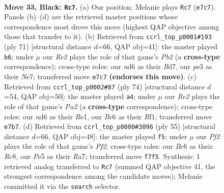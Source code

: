 \documentclass[11pt]{article}
\begin{document}
\clearpage

\begin{figure}[p]\centering
\begin{subfigure}{0.46\textwidth}\centering
\resizebox{\linewidth}{!}{%
\newchessgame
\chessboard[
  setfen={r5k1/4rppp/nnbN4/p3p1P1/8/1P2P1R1/P3B1PP/RN5K b - - 5 33},
  showmover=false,
  pgfstyle=straightmove, color=movearrow, markmove={e7-c7}
]}
\caption{}
\end{subfigure}\hfill
\begin{subfigure}{0.46\textwidth}\centering
\resizebox{\linewidth}{!}{%
\newchessgame
\chessboard[
  setfen={2r5/1p1bnpk1/7p/p2pr1p1/P7/1PP4P/2BRNPP1/1R3K2 b - - 8 36},
  showmover=false,
  pgfstyle=straightmove, color=movearrow, markmove={b7-b6}
]}
\caption{}
\end{subfigure}
\\[4pt]
\begin{subfigure}{0.46\textwidth}\centering
\resizebox{\linewidth}{!}{%
\newchessgame
\chessboard[
  setfen={3br1n1/1kp2r2/p7/1pp1Pp2/7p/2N4P/PPP3PB/4RR1K w - - 8 38},
  showmover=false,
  pgfstyle=straightmove, color=movearrow, markmove={a2-a4}
]}
\caption{}
\end{subfigure}\hfill
\begin{subfigure}{0.46\textwidth}\centering
\resizebox{\linewidth}{!}{%
\newchessgame
\chessboard[
  setfen={2r3k1/r3bppp/8/p3N3/P2pn3/8/1PP2PPP/R1R1B1K1 b - - 1 28},
  showmover=false,
  pgfstyle=straightmove, color=movearrow, markmove={f7-f5}
]}
\caption{}
\end{subfigure}
\caption{\textbf{Move 33, Black: \texttt{Rc7}.} (a) Our position; Melanie plays \texttt{Rc7} (\texttt{e7c7}). Panels (b)--(d) are the retrieved master positions whose correspondence most drove this move (highest QAP objective among those that transfer to it). (b) Retrieved from \texttt{ccrl\_top\_p0001\#193} (ply 71) [structural distance $d$=66, QAP obj=41]: the master played \texttt{b6}; under $\mu$ our \emph{Re2} plays the role of that game's \emph{Pb2} (a \textbf{cross-type} correspondence); cross-type roles: our \emph{n}d6 as their \emph{B}d7, our \emph{p}e3 as their \emph{N}e7; transferred move \texttt{e7c7} \textbf{(endorses this move)}. (c) Retrieved from \texttt{ccrl\_top\_p0002\#87} (ply 74) [structural distance $d$=54, QAP obj=50]: the master played \texttt{a4}; under $\mu$ our \emph{Re2} plays the role of that game's \emph{Pa2} (a \textbf{cross-type} correspondence); cross-type roles: our \emph{n}d6 as their \emph{R}e1, our \emph{B}c6 as their \emph{R}f1; transferred move \texttt{e7b7}. (d) Retrieved from \texttt{ccrl\_top\_p0000\#3096} (ply 55) [structural distance $d$=66, QAP obj=48]: the master played \texttt{f5}; under $\mu$ our \emph{Pf2} plays the role of that game's \emph{Pf2}; cross-type roles: our \emph{B}c6 as their \emph{R}c8, our \emph{P}e5 as their \emph{R}a7; transferred move \texttt{f7f5}. Synthesis: 1 retrieved analog transferred to \texttt{Rc7} (summed QAP objective 41, the strongest correspondence among the candidate moves); Melanie committed it via the \texttt{search} selector.}
\label{fig:thought-m65}
\end{figure}
\end{document}
